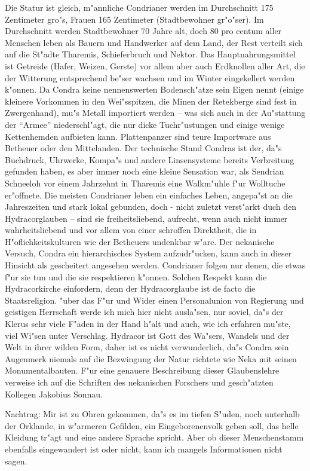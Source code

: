 \documentclass[a5paper,8pt]{book}
\begin{document}
Die Statur ist gleich, m"annliche Condrianer werden im Durchschnitt 175 Zentimeter gro"s, Frauen 165 Zentimeter (Stadtbewohner gr"o"ser). Im Durchschnitt werden Stadtbewohner 70 Jahre alt, doch 80 pro centum aller Menschen leben als Bauern und Handwerker auf dem Land, der Rest verteilt sich auf die St"adte Tharemis, Schieferbruch und Nektor. Das Hauptnahrungsmittel ist Getreide (Hafer, Weizen, Gerste) vor allem aber auch Erdknollen aller Art, die der Witterung entsprechend be"ser wachsen und im Winter eingekellert werden k"onnen. Da Condra keine nennenswerten Bodensch"atze sein Eigen nennt (einige kleinere Vorkommen in den Wei"sspitzen, die Minen der Retekberge sind fest in Zwergenhand), mu"s Metall importiert werden – was sich auch in der Au"stattung der “Armee” niederschl"agt, die nur dicke Tuchr"ustungen und einige wenige Kettenhemden aufbieten kann. Plattenpanzer sind teure Importware aus Betheuer oder den Mittelanden. Der technische Stand Condras ist der, da"s Buchdruck, Uhrwerke, Kompa"s und andere 
Linsensysteme bereits Verbreitung gefunden haben, es aber  immer noch eine kleine Sensation war, als Sendrian Schneeloh vor einem Jahrzehnt in Tharemis eine Walkm"uhle f"ur Wolltuche er"offnete. Die meisten Condrianer leben ein einfaches Leben, angepa"st an die Jahreszeiten und stark lokal gebunden, doch - nicht zuletzt verst"arkt duch den Hydracorglauben – sind sie freiheitsliebend, aufrecht, wenn auch nicht immer wahrheitsliebend und vor allem von einer schroffen Direktheit, die in H"oflichkeitskulturen wie der Betheuers undenkbar w"are.
Der nekanische Versuch, Condra ein hierarchisches System aufzudr"ucken, kann auch in dieser Hinsicht als gescheitert angesehen werden. Condrianer folgen nur denen, die etwas f"ur sie tun und die sie respektieren k"onnen. Solchen Respekt kann die Hydracorkirche einfordern, denn der Hydracorglaube ist de facto die Staatsreligion. "uber das F"ur und Wider einen Personalunion von Regierung und geistigen Herrschaft werde ich mich hier nicht ausla"sen, nur soviel, da"s der Klerus sehr viele F"aden in der Hand h"alt und auch, wie ich erfahren mu"ste, viel Wi"sen unter Verschlag. 
Hydracor ist Gott des Wa"sers, Wandels und der Welt in ihrer wilden Form, daher ist es nicht verwunderlich, da"s Condra sein Augenmerk niemals auf die Bezwingung der Natur richtete wie Neka mit seinen Monumentalbauten. F"ur eine genauere Beschreibung dieser Glaubenslehre verweise ich auf die Schriften des nekanischen Forschers und gesch"atzten Kollegen Jakobius Sonnau. 

Nachtrag: Mir ist zu Ohren gekommen, da"s es im tiefen S"uden, noch unterhalb der Orklande, in w"armeren Gefilden, ein Eingeborenenvolk geben soll, das helle Kleidung tr"agt und eine andere Sprache spricht. Aber ob dieser Menschenstamm ebenfalls eingewandert ist oder nicht, kann ich mangels Informationen nicht sagen. 
\end{document}
